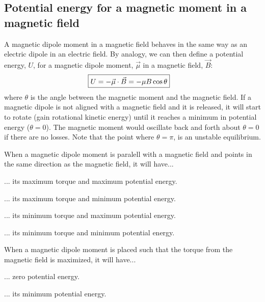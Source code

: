 \subsection{Potential energy for a magnetic moment in a magnetic field}
A magnetic dipole moment in a magnetic field behaves in the same way as an electric dipole in an electric field. By analogy, we can then define a potential energy, $U$, for a magnetic dipole moment, $\vec \mu$ in a magnetic field, $\vec B$:
\begin{align*}
\Aboxed{U =-\vec \mu \cdot \vec B =- \mu B \cos\theta}
\end{align*}
where $\theta$ is the angle between the magnetic moment and the magnetic field. If a magnetic dipole is not aligned with a magnetic field and it is released, it will start to rotate (gain rotational kinetic energy) until it reaches a minimum in potential energy ($\theta = 0$). The magnetic moment would oscillate back and forth about $\theta =0$ if there are no losses. Note that the point where $\theta = \pi$, is an unstable equilibrium.
\begin{checkpoint}{}
	\begin{MCquestion}{When a magnetic dipole moment is paralell with a magnetic field and points in the same direction as the magnetic field, it will have...}
		\item ... its maximum torque and maximum potential energy.
		\item ... its maximum torque and minimum potential energy.
		\item ... its minimum torque and maximum potential energy.
		\item ... its minimum torque and minimum potential energy. \correct
	\end{MCquestion}
\end{checkpoint}

\begin{checkpoint}{}
	\begin{MCquestion}{When a magnetic dipole moment is placed such that the torque from the magnetic field is maximized, it will have...}
		\item ... zero potential energy. \correct
		\item ... its minimum potential energy.
	\end{MCquestion}
\end{checkpoint}

